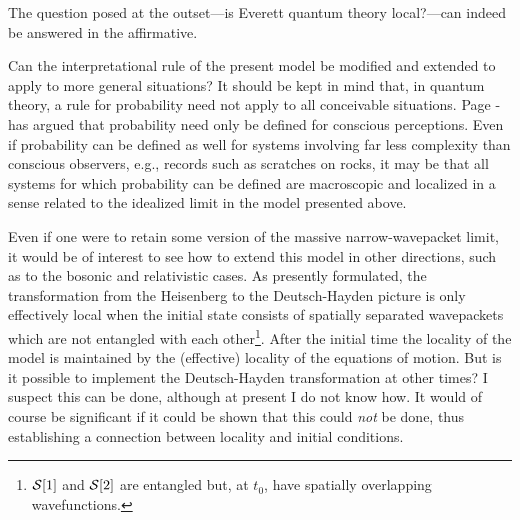 \documentclass[12pt]{article}
\begin{document}
The question posed at the outset---is Everett quantum theory local?---can indeed be answered in the affirmative.

Can the interpretational rule of the present model be modified and extended to apply to more general situations? It should be kept in
mind that, in quantum theory, a rule for probability need not apply to all conceivable situations. Page \cite{Page94}-\cite{Page96} has argued that
probability need only be defined for conscious perceptions. Even if  probability can be defined as well for
systems involving far less complexity than conscious observers, e.g., records such as scratches on rocks, it may be that  all systems for
which probability can be defined are macroscopic and localized in a sense related to the idealized limit in the model presented above.

Even if one were to retain some version of the massive narrow-wavepacket limit, it would be of interest to see how to extend this model in other directions, such as to the bosonic and relativistic cases. As presently formulated, the transformation from the Heisenberg
to the Deutsch-Hayden picture is only effectively local when the initial state consists of spatially separated wavepackets
which are not entangled with each other\footnote{$\cS[1]$\/ and  $\cS[2]$\/ are entangled but, at $t_0$\/, have spatially overlapping
wavefunctions.}. After the initial time the locality of the model is maintained by the (effective) locality of the equations of motion.  But is it possible to implement the Deutsch-Hayden transformation at other times? I suspect this can be done, although at present I do
not know how. It would of course be significant if it could be shown that
this could {\em not}\/ be done, thus establishing a connection between  locality and initial conditions.
 
\end{document}
